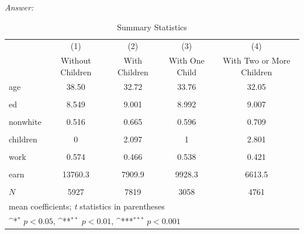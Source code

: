 \documentclass{article}
\begin{document}
\begin{enumerate}
\textit{Answer: }
\begin{table}[htbp]\centering
	\def\sym#1{\ifmmode^{#1}\else\(^{#1}\)\fi}
	\caption{Summary Statistics}
	\begin{tabular}{l*{4}{c}}
		\hline\hline
		&\multicolumn{1}{c}{(1)}&\multicolumn{1}{c}{(2)}&\multicolumn{1}{c}{(3)}&\multicolumn{1}{c}{(4)}\\
		&\multicolumn{1}{c}{Without Children}&\multicolumn{1}{c}{With Children}&\multicolumn{1}{c}{With One Child}&\multicolumn{1}{c}{With Two or More Children}\\
		\hline
		age         &       38.50         &       32.72         &       33.76         &       32.05         \\
		&                     &                     &                     &                     \\
		[1em]
		ed          &       8.549         &       9.001         &       8.992         &       9.007         \\
		&                     &                     &                     &                     \\
		[1em]
		nonwhite    &       0.516         &       0.665         &       0.596         &       0.709         \\
		&                     &                     &                     &                     \\
		[1em]
		children    &           0         &       2.097         &           1         &       2.801         \\
		&                     &                     &                     &                     \\
		[1em]
		work        &       0.574         &       0.466         &       0.538         &       0.421         \\
		&                     &                     &                     &                     \\
		[1em]
		earn        &     13760.3         &      7909.9         &      9928.3         &      6613.5         \\
		&                     &                     &                     &                     \\
		\hline
		\(N\)       &        5927         &        7819         &        3058         &        4761         \\
		\hline\hline
		\multicolumn{5}{l}{\footnotesize mean coefficients; \textit{t} statistics in parentheses}\\
		\multicolumn{5}{l}{\footnotesize \sym{*} \(p<0.05\), \sym{**} \(p<0.01\), \sym{***} \(p<0.001\)}\\
	\end{tabular}
\end{table}






\end{enumerate}
\end{document}
